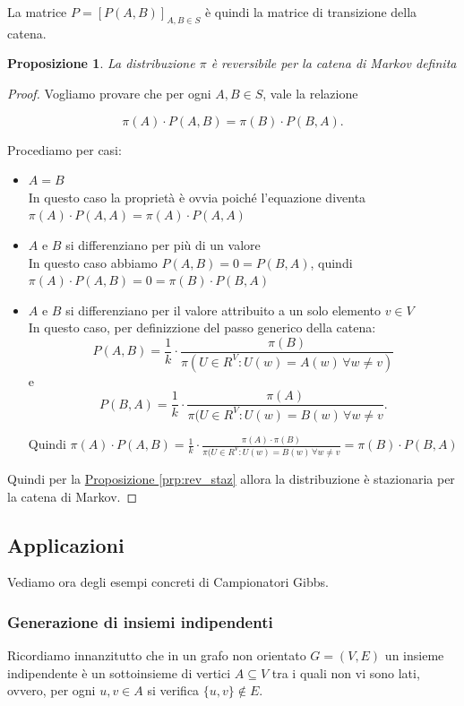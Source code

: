 \documentclass{article}
\newtheorem{proposition}{Proposizione}[section]
\begin{document}
\noindent
La matrice $ P = [P(A, B)]_{A,B \in S} $ è quindi la matrice di transizione della catena.

\begin{proposition}
\label{prp:gibbs_reversible}
La distribuzione $ \pi $ è reversibile per la catena di Markov definita
\end{proposition}
\begin{proof}
Vogliamo provare che per ogni \( A, B \in S \), vale la relazione

\[
\pi(A) \cdot P(A,B) = \pi(B) \cdot P(B,A).
\]

Procediamo per casi:
\begin{itemize}
    \item $A = B $ \\
    In questo caso la proprietà è ovvia poiché l'equazione diventa $\pi(A) \cdot P(A,A) = \pi(A) \cdot P(A,A)$
    \item $A$ e $B$ si differenziano per più di un valore \\
    In questo caso abbiamo $P(A,B) = 0 = P(B,A)$, quindi $\pi(A) \cdot P(A,B) = 0 = \pi(B) \cdot P(B,A)$
    \item  \( A \) e \( B \) si differenziano per il valore attribuito a un solo elemento \( v \in V \) \\
    In questo caso, per definizzione del passo generico della catena:
    \[
        P(A,B) = \frac{1}{k} \cdot \frac{\pi(B)}{\pi(U \in R^V : U(w) = A(w) \, \forall w \neq v)}
    \]
    e
    \[
        P(B,A) = \frac{1}{k} \cdot \frac{\pi(A)}{\pi(U \in R^V : U(w) = B(w) \, \forall w \neq v}.
    \]

    Quindi $\pi(A) \cdot P(A,B) =  \frac{1}{k} \cdot \frac{\pi(A) \cdot \pi(B)}{\pi(U \in R^V : U(w) = B(w) \, \forall w \neq v} =  \pi(B) \cdot P(B,A)$
\end{itemize}

Quindi per la \hyperref[prp:rev_staz]{Proposizione \ref*{prp:rev_staz}} allora la distribuzione è stazionaria per la catena di Markov.
\end{proof}


\subsection{Applicazioni}
Vediamo ora degli esempi concreti di Campionatori Gibbs.
\subsubsection{Generazione di insiemi indipendenti}
Ricordiamo innanzitutto che in un grafo non orientato $ G = (V, E) $ un insieme indipendente è un sottoinsieme di vertici $ A \subseteq V $ tra i quali non vi sono lati, ovvero, per ogni $ u, v \in A $ si verifica $ \{u, v\} \notin E $.
\end{document}
